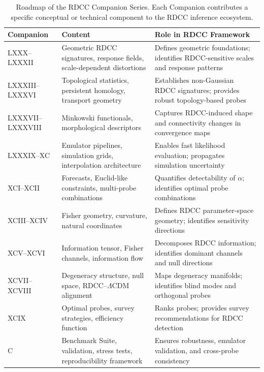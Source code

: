 \documentclass[11pt,a4paper]{article}
\begin{document}
\begin{table}[t]
\centering
\renewcommand{\arraystretch}{1.25}
\begin{tabular}{p{2.2cm} p{6.2cm} p{6.2cm}}
\hline
\textbf{Companion} & \textbf{Content} & \textbf{Role in RDCC Framework} \\
\hline

LXXX--LXXXII &
Geometric RDCC signatures, response fields, scale-dependent distortions &
Defines geometric foundations; identifies RDCC-sensitive scales and response patterns \\

LXXXIII--LXXXVI &
Topological statistics, persistent homology, transport geometry &
Establishes non-Gaussian RDCC signatures; provides robust topology-based probes \\

LXXXVII--LXXXVIII &
Minkowski functionals, morphological descriptors &
Captures RDCC-induced shape and connectivity changes in convergence maps \\

LXXXIX--XC &
Emulator pipelines, simulation grids, interpolation architecture &
Enables fast likelihood evaluation; propagates simulation uncertainty \\

XCI--XCII &
Forecasts, Euclid-like constraints, multi-probe combinations &
Quantifies detectability of $\alpha$; identifies optimal probe combinations \\

XCIII--XCIV &
Fisher geometry, curvature, natural coordinates &
Defines RDCC parameter-space geometry; identifies sensitivity directions \\

XCV--XCVI &
Information tensor, Fisher channels, information flow &
Decomposes RDCC information; identifies dominant channels and null directions \\

XCVII--XCVIII &
Degeneracy structure, null space, RDCC–$\Lambda$CDM alignment &
Maps degeneracy manifolds; identifies blind modes and orthogonal probes \\

XCIX &
Optimal probes, survey strategies, efficiency function &
Ranks probes; provides survey recommendations for RDCC detection \\

C &
Benchmark Suite, validation, stress tests, reproducibility framework &
Ensures robustness, emulator validation, and cross-probe consistency \\

\hline
\end{tabular}
\caption{Roadmap of the RDCC Companion Series. Each Companion contributes a 
specific conceptual or technical component to the RDCC inference ecosystem.}
\end{table}
\end{document}
